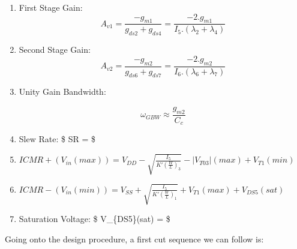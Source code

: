 \documentclass[
]{article}
\begin{document}
\begin{enumerate}
\def\labelenumi{\arabic{enumi}.}
\item
  First Stage Gain:
  \[ A_{v1} = \frac{-g_{m1}}{g_{ds2} + g_{ds4}} = \frac{-2.g_{m1}}{I_{5}.(\lambda_{2} + \lambda_{4})} \]
\item
  Second Stage Gain:
  \[ A_{v2} = \frac{-g_{m2}}{g_{ds6} + g_{ds7}} = \frac{-2.g_{m2}}{I_{6}.(\lambda_{6} + \lambda_{7})} \]
\item
  Unity Gain Bandwidth:

  \[\omega_{GBW} \approx \frac{g_{m2}}{C_{c}}\]
\item
  Slew Rate: \$ SR =  \$
\item
  \(ICMR+ (V_{in}(max)) = V_{DD} - \sqrt{\frac{I_{5}}{K'(\frac{W}{L})_{3}}} - |V_{T03}|(max) + V_{T1}(min)\)
\item
  \(ICMR- (V_{in}(min)) = V_{SS} + \sqrt{\frac{I_{5}}{K'(\frac{W}{L})_{1}}} + V_{T1}(max) + V_{DS5}(sat)\)
\item
  Saturation Voltage: \$ V\_\{DS5\}(sat) =
   \$
\end{enumerate}

Going onto the design procedure, a first cut sequence we can follow is:
\end{document}
